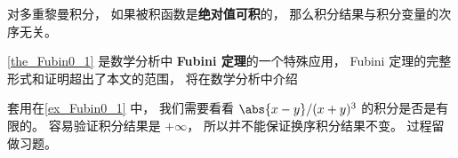 \begin{theorem}{}\label{the_Fubin0_1}
对多重黎曼积分， 如果被积函数是\textbf{绝对值可积}的， 那么积分结果与积分变量的次序无关。
\end{theorem}
\autoref{the_Fubin0_1} 是数学分析中 \textbf{Fubini 定理}的一个特殊应用， Fubini 定理的完整形式和证明超出了本文的范围， 将在数学分析中介绍%

套用在\autoref{ex_Fubin0_1} 中， 我们需要看看 $\abs{x-y}/(x+y)^3$ 的积分是否是有限的。 容易验证积分结果是 $+\infty$， 所以并不能保证换序积分结果不变。 过程留做习题。


